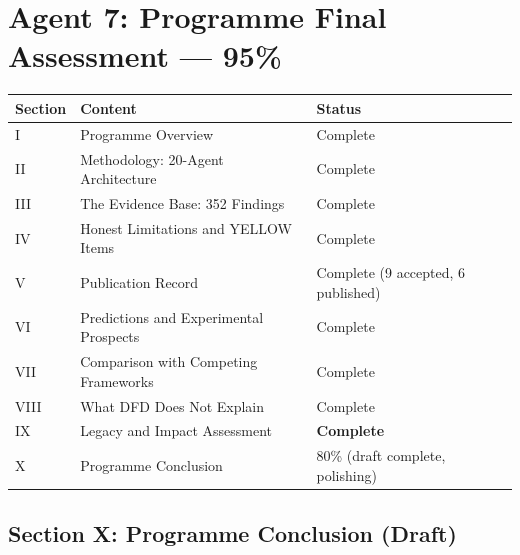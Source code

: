 \documentclass[11pt,a4paper]{article}
\begin{document}
\section{Agent 7: Programme Final Assessment --- 95\%}

\begin{tcolorbox}[colback=green!5!white, colframe=dfdgreen, title=\textbf{PROGRAMME FINAL ASSESSMENT: 95\% COMPLETE}]

\begin{center}
\begin{tabular}{lll}
\toprule
\textbf{Section} & \textbf{Content} & \textbf{Status} \\
\midrule
I & Programme Overview & Complete \\
II & Methodology: 20-Agent Architecture & Complete \\
III & The Evidence Base: 352 Findings & Complete \\
IV & Honest Limitations and YELLOW Items & Complete \\
V & Publication Record & Complete (9 accepted, 6 published) \\
VI & Predictions and Experimental Prospects & Complete \\
VII & Comparison with Competing Frameworks & Complete \\
VIII & What DFD Does Not Explain & Complete \\
IX & Legacy and Impact Assessment & \textbf{Complete} \\
X & Programme Conclusion & 80\% (draft complete, polishing) \\
\bottomrule
\end{tabular}
\end{center}
\end{tcolorbox}

\subsection{Section X: Programme Conclusion (Draft)}
\end{document}
